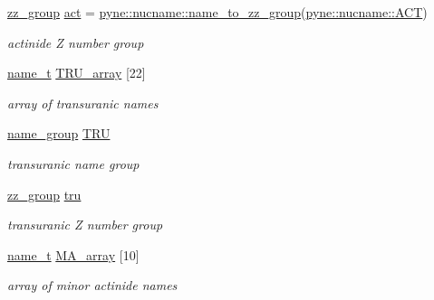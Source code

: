 \begin{DoxyCompactItemize}
\mbox{\label{namespacepyne_1_1nucname_a388ff81a89b2258f0ac2b353af72032a}} 
\hyperlink{namespacepyne_1_1nucname_a2e9463e61005389bbc50bfa210061582}{zz\+\_\+group} \hyperlink{namespacepyne_1_1nucname_a388ff81a89b2258f0ac2b353af72032a}{act} = \hyperlink{namespacepyne_1_1nucname_a0f6bd8d281ff5aa5fd5b48e16b867062}{pyne\+::nucname\+::name\+\_\+to\+\_\+zz\+\_\+group}(\hyperlink{namespacepyne_1_1nucname_a47f7c8b69afe39df2b9de731a6018e64}{pyne\+::nucname\+::\+A\+CT})
\begin{DoxyCompactList}\small\item\em actinide Z number group \end{DoxyCompactList}\item 
\hyperlink{namespacepyne_1_1nucname_aed6b656cde69b79b33f6af37fabb2054}{name\+\_\+t} \hyperlink{namespacepyne_1_1nucname_ab148461391c413fb7a7176821d65d2e6}{T\+R\+U\+\_\+array} \mbox{[}22\mbox{]}
\begin{DoxyCompactList}\small\item\em array of transuranic names \end{DoxyCompactList}\item 
\mbox{\label{namespacepyne_1_1nucname_adfc1f43df3ea014a500e2c79e0c2f053}} 
\hyperlink{namespacepyne_1_1nucname_a8959cfbd85b0ccc8b51ca14e98de9791}{name\+\_\+group} \hyperlink{namespacepyne_1_1nucname_adfc1f43df3ea014a500e2c79e0c2f053}{T\+RU}
\begin{DoxyCompactList}\small\item\em transuranic name group \end{DoxyCompactList}\item 
\hyperlink{namespacepyne_1_1nucname_a2e9463e61005389bbc50bfa210061582}{zz\+\_\+group} \hyperlink{namespacepyne_1_1nucname_af6669ddbefba8098a45e4fc27edc5c68}{tru}
\begin{DoxyCompactList}\small\item\em transuranic Z number group \end{DoxyCompactList}\item 
\hyperlink{namespacepyne_1_1nucname_aed6b656cde69b79b33f6af37fabb2054}{name\+\_\+t} \hyperlink{namespacepyne_1_1nucname_a1fc606ecf5edbc2390523178c65ac856}{M\+A\+\_\+array} \mbox{[}10\mbox{]}
\begin{DoxyCompactList}\small\item\em array of minor actinide names \end{DoxyCompactList}\item 

\end{DoxyCompactItemize}
